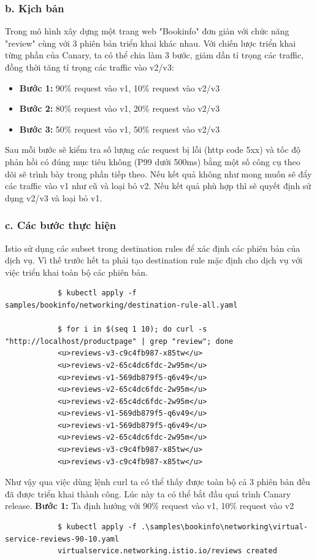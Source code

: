 \documentclass[14pt,a4paper]{book}
\begin{document}
{{		\subsubsection{b. Kịch bản}
		Trong mô hình xây dựng một trang web "Bookinfo" đơn giản với chức năng "review" cùng với 3 phiên bản triển khai khác nhau. Với chiến lược triển khai từng phần của Canary, ta có thể chia làm 3 bước, giảm dần tỉ trọng các traffic, đồng thời tăng tỉ trọng các traffic vào v2/v3:
		\begin{itemize}
			\item \textbf{Bước 1:} 90\% request vào v1, 10\% request vào v2/v3
			\item \textbf{Bước 2:} 80\% request vào v1, 20\% request vào v2/v3
			\item \textbf{Bước 3:} 50\% request vào v1, 50\% request vào v2/v3
		\end{itemize}
		Sau mỗi bước sẽ kiểm tra số lượng các request bị lỗi (http code 5xx) và tốc độ phản hồi có đúng mục tiêu không (P99 dưới 500ms) bằng một số công cụ theo dõi sẽ trình bày trong phần tiếp theo. Nếu kết quả không như mong muốn sẽ đẩy các traffic vào v1 như cũ và loại bỏ v2. Nếu kết quả phù hợp thì sẽ quyết định sử dụng v2/v3 và loại bỏ v1.
		\subsubsection{c. Các bước thực hiện}
		Istio sử dụng các subset trong destination rules để xác định các phiên bản của dịch vụ. Vì thế trước hết ta phải tạo destination rule mặc định cho dịch vụ với việc triển khai toàn bộ các phiên bản.
		\begin{lstlisting}
			$ kubectl apply -f samples/bookinfo/networking/destination-rule-all.yaml
			
			$ for i in $(seq 1 10); do curl -s "http://localhost/productpage" | grep "review"; done
			<u>reviews-v3-c9c4fb987-x85tw</u>
			<u>reviews-v2-65c4dc6fdc-2w95m</u>
			<u>reviews-v1-569db879f5-q6v49</u>
			<u>reviews-v2-65c4dc6fdc-2w95m</u>
			<u>reviews-v2-65c4dc6fdc-2w95m</u>
			<u>reviews-v1-569db879f5-q6v49</u>
			<u>reviews-v1-569db879f5-q6v49</u>
			<u>reviews-v2-65c4dc6fdc-2w95m</u>
			<u>reviews-v3-c9c4fb987-x85tw</u>
			<u>reviews-v3-c9c4fb987-x85tw</u>
		\end{lstlisting}
		Như vậy qua việc dùng lệnh {\color{red}curl} ta có thể thấy được toàn bộ cả 3 phiên bản đều đã được triển khai thành công.
		Lúc này ta có thể bắt đầu quá trình Canary release.
		\textbf{Bước 1:} Ta định hướng với 90\% request vào v1, 10\% request vào v2
		\begin{lstlisting}
			$ kubectl apply -f .\samples\bookinfo\networking\virtual-service-reviews-90-10.yaml
			virtualservice.networking.istio.io/reviews created
			

\end{lstlisting}}}
\end{document}
